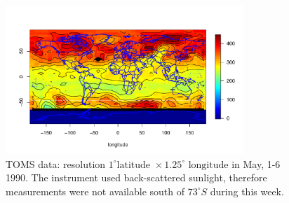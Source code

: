 \vfill


\begin{figure}[H]
\label{TOMS_data}
\centering
\includegraphics [width=0.8\textwidth, keepaspectratio]{graphs/TOMS_data.pdf}
\caption [TOMS Data: Resolution $1^\circ \mbox{latitude } \times 1.25^\circ \mbox{ longitude}$ in May, 1-6 1990.]{TOMS data: resolution $1^\circ \mbox{latitude } \times 1.25^\circ \mbox{ longitude}$ in May, 1-6 1990. The instrument used back-scattered sunlight, therefore measurements were not available south of $73^\circ S$ during this week.}
\end{figure}

